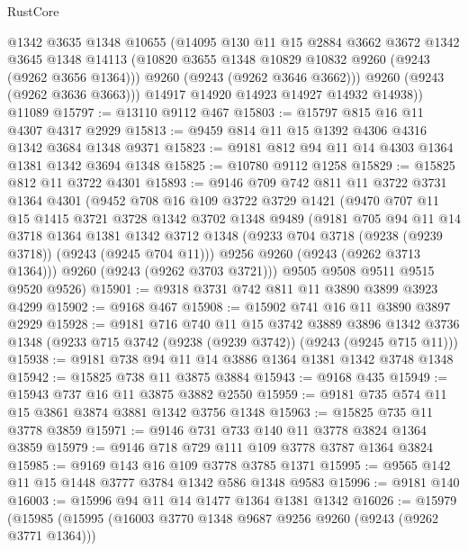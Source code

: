 \begin{lexlean}{RustCore}
\begin{coremodule}
          @1342
          @3635
          @1348
          @10655
          (@14095
            @130
            @11
            @15
            @2884
            @3662
            @3672
            @1342
            @3645
            @1348
            @14113
            (@10820 @3655 @1348 @10829 @10832 @9260 (@9243 (@9262 @3656 @1364)))
            @9260
            (@9243 (@9262 @3646 @3662)))
          @9260
          (@9243 (@9262 @3636 @3663)))
        @14917
        @14920
        @14923
        @14927
        @14932
        @14938))
    @11089
@15797 := @13110 @9112 @467
@15803 := @15797 @815 @16 @11 @4307 @4317 @2929
@15813 := @9459 @814 @11 @15 @1392 @4306 @4316 @1342 @3684 @1348 @9371
@15823 := @9181 @812 @94 @11 @14 @4303 @1364 @1381 @1342 @3694 @1348
@15825 := @10780 @9112 @1258
@15829 := @15825 @812 @11 @3722 @4301
@15893 := @9146
    @709
    @742
    @811
    @11
    @3722
    @3731
    @1364
    @4301
    (@9452
      @708
      @16
      @109
      @3722
      @3729
      @1421
      (@9470
        @707
        @11
        @15
        @1415
        @3721
        @3728
        @1342
        @3702
        @1348
        @9489
        (@9181
          @705
          @94
          @11
          @14
          @3718
          @1364
          @1381
          @1342
          @3712
          @1348
          (@9233 @704 @3718 (@9238 (@9239 @3718)) (@9243 (@9245 @704 @11)))
          @9256
          @9260
          (@9243 (@9262 @3713 @1364)))
        @9260
        (@9243 (@9262 @3703 @3721)))
      @9505
      @9508
      @9511
      @9515
      @9520
      @9526)
@15901 := @9318 @3731 @742 @811 @11 @3890 @3899 @3923 @4299
@15902 := @9168 @467
@15908 := @15902 @741 @16 @11 @3890 @3897 @2929
@15928 := @9181
    @716
    @740
    @11
    @15
    @3742
    @3889
    @3896
    @1342
    @3736
    @1348
    (@9233 @715 @3742 (@9238 (@9239 @3742)) (@9243 (@9245 @715 @11)))
@15938 := @9181 @738 @94 @11 @14 @3886 @1364 @1381 @1342 @3748 @1348
@15942 := @15825 @738 @11 @3875 @3884
@15943 := @9168 @435
@15949 := @15943 @737 @16 @11 @3875 @3882 @2550
@15959 := @9181 @735 @574 @11 @15 @3861 @3874 @3881 @1342 @3756 @1348
@15963 := @15825 @735 @11 @3778 @3859
@15971 := @9146 @731 @733 @140 @11 @3778 @3824 @1364 @3859
@15979 := @9146 @718 @729 @111 @109 @3778 @3787 @1364 @3824
@15985 := @9169 @143 @16 @109 @3778 @3785 @1371
@15995 := @9565 @142 @11 @15 @1448 @3777 @3784 @1342 @586 @1348 @9583
@15996 := @9181 @140
@16003 := @15996 @94 @11 @14 @1477 @1364 @1381 @1342
@16026 := @15979
    (@15985
      (@15995
        (@16003 @3770 @1348 @9687 @9256 @9260 (@9243 (@9262 @3771 @1364)))

\end{coremodule}
\end{lexlean}
